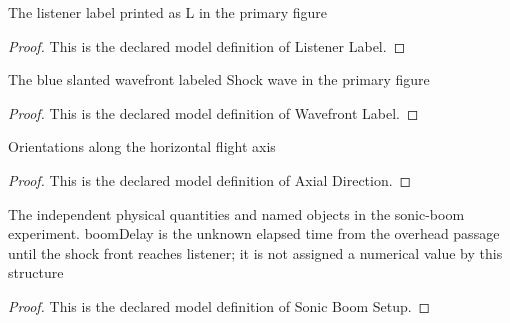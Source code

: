 \begin{definition}
  \label{def:physics:phyx-mini-0198:phyxminiproblems-problemphyxmini0198-listenerlabel}
  The listener label printed as L in the primary figure
\end{definition}
\begin{proof}
  This is the declared model definition of Listener Label.
\end{proof}
\begin{definition}
  \label{def:physics:phyx-mini-0198:phyxminiproblems-problemphyxmini0198-wavefrontlabel}
  The blue slanted wavefront labeled Shock wave in the primary figure
\end{definition}
\begin{proof}
  This is the declared model definition of Wavefront Label.
\end{proof}
\begin{definition}
  \label{def:physics:phyx-mini-0198:phyxminiproblems-problemphyxmini0198-axialdirection}
  Orientations along the horizontal flight axis
\end{definition}
\begin{proof}
  This is the declared model definition of Axial Direction.
\end{proof}
\begin{definition}
  \label{def:physics:phyx-mini-0198:phyxminiproblems-problemphyxmini0198-sonicboomsetup}
  The independent physical quantities and named objects in the sonic-boom experiment. boomDelay is the unknown elapsed time from the overhead passage until the shock front reaches listener; it is not assigned a numerical value by this structure
\end{definition}
\begin{proof}
  This is the declared model definition of Sonic Boom Setup.
\end{proof}
